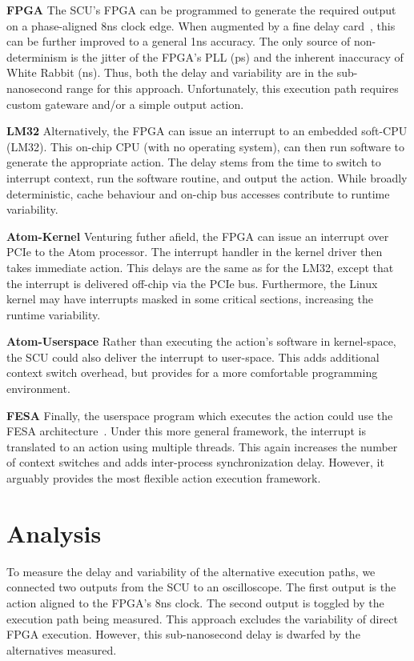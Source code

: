 \documentclass{JAC2003}
\begin{document}
\textbf{FPGA} 
The SCU's FPGA can be programmed to generate the required output
on a phase-aligned 8ns clock edge. 
When augmented by a fine delay card~\cite{cern-fine-delay},
this can be further improved to a general 1ns accuracy.
The only source of non-determinism is the jitter of the FPGA's PLL (ps) 
and the inherent inaccuracy of White Rabbit (ns).
Thus, both the delay and variability are in the sub-nanosecond range 
for this approach.
Unfortunately, this execution path requires custom gateware and/or
a simple output action.

\textbf{LM32} 
Alternatively, the FPGA can issue an interrupt to an embedded soft-CPU (LM32).
This on-chip CPU (with no operating system), 
can then run software to generate the appropriate action.
The delay stems from the time to switch to interrupt context,
run the software routine,
and output the action.
While broadly deterministic,
cache behaviour and on-chip bus accesses contribute to runtime variability.

\textbf{Atom-Kernel}
Venturing futher afield,
the FPGA can issue an interrupt over PCIe to the Atom processor.
The interrupt handler in the kernel driver then takes immediate action.
This delays are the same as for the LM32, 
except that the interrupt is delivered off-chip via the PCIe bus.
Furthermore, 
the Linux kernel may have interrupts masked in some critical sections,
increasing the runtime variability.

\textbf{Atom-Userspace}
Rather than executing the action's software in kernel-space,
the SCU could also deliver the interrupt to user-space.
This adds additional context switch overhead, 
but provides for a more comfortable programming environment.

\textbf{FESA}
Finally, the userspace program which executes the action could use the FESA
architecture~\cite{fesa}.
Under this more general framework,
the interrupt is translated to an action using multiple threads.
This again increases the number of context switches and adds inter-process
synchronization delay.
However, it arguably provides the most flexible action execution framework.

\section{Analysis}
To measure the delay and variability of the alternative execution paths,
we connected two outputs from the SCU to an oscilloscope.
The first output is the action aligned to the FPGA's 8ns clock.
The second output is toggled by the execution path being measured.
This approach excludes the variability of direct FPGA execution.
However, this sub-nanosecond delay is dwarfed by the alternatives measured.
\end{document}
